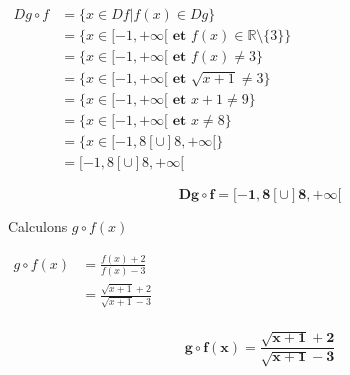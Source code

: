 \documentclass[12pt,a4paper]{article}
\begin{document}
\begin{enumerate}
\begin{enumerate}
              \( 
              \begin{aligned}
              Dg \circ f &= \{ x\in Df | f(x) \in Dg \}\\
              					 &= \{ x\in [-1,+\infty[ \textbf{ et } f(x) \in \mathbb{R}\setminus\{ 3 \} \}\\
              					 &= \{ x\in [-1,+\infty[ \textbf{ et } f(x) \neq 3 \}\\ 
              					 &= \{ x\in [-1,+\infty[ \textbf{ et } \sqrt{x + 1} \neq 3 \}\\
              					 &= \{ x\in [-1,+\infty[ \textbf{ et } x+1 \neq 9 \}\\
              					 &= \{ x\in [-1,+\infty[ \textbf{ et } x \neq 8 \}\\
              					 &= \{ x\in [-1,8[ \cup ]8,+\infty[ \}\\
              					 &=[-1,8[ \cup ]8,+\infty[
              \end{aligned}
              \)
              
                    \begin{resultbox}
                        \[
                            \mathbf{Dg \circ f=[-1,8[ \cup ]8,+\infty[ }
                        \]
                    \end{resultbox}

						Calculons \( g \circ f(x) \) 
						
						\( 
              \begin{aligned} 
              g \circ f(x) &= \frac{f(x) + 2}{f(x) - 3}\\ 
              						 &= \frac{\sqrt{x + 1} + 2}{\sqrt{x + 1} - 3}\\ 
               \end{aligned}
              \)                 

                   \begin{resultbox}
                        \[
                            \mathbf{ g \circ f(x) = \frac{\sqrt{x + 1} + 2}{\sqrt{x + 1} - 3} }
                        \]
                    \end{resultbox}                    
                    
          \end{enumerate}

\end{enumerate}
\end{document}
